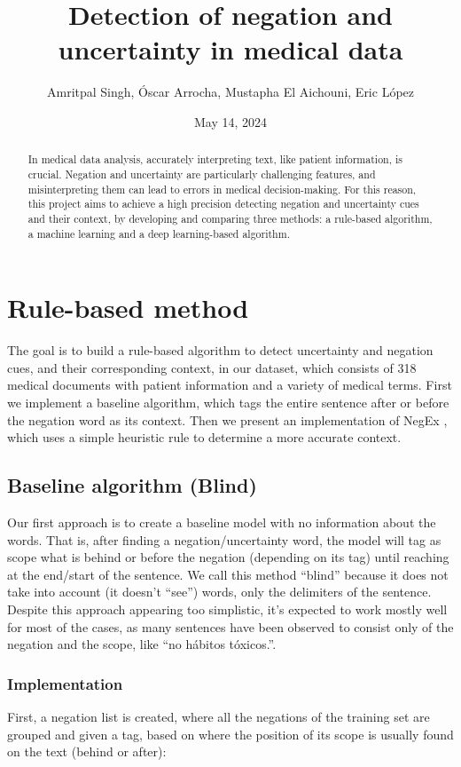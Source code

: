 \documentclass{article}
\begin{document}
\title{Detection of negation and uncertainty in medical data}
\author{Amritpal Singh, Óscar Arrocha, Mustapha El Aichouni, Eric López}
\date{May 14, 2024}
\maketitle

\begin{abstract}
	In medical data analysis, accurately interpreting text, like patient information, is crucial.
	Negation and uncertainty are particularly challenging features, and misinterpreting them can
	lead to errors in medical decision-making. For this reason, this project aims to achieve a high
	precision detecting negation and uncertainty cues and their context, by developing and comparing
	three methods: a rule-based algorithm, a machine learning and a deep learning-based algorithm.
\end{abstract}

\section*{Rule-based method}
The goal is to build a rule-based algorithm to detect uncertainty and negation cues, and their
corresponding context, in our dataset, which consists of 318 medical documents with patient information
and a variety of medical terms. First we implement a baseline algorithm, which tags the entire sentence
after or before the negation word as its context. Then we present an implementation of NegEx \cite{negex},
which uses a simple heuristic rule to determine a more accurate context.

\subsection*{Baseline algorithm (Blind)}
Our first approach is to create a baseline model with no information about the words. That is, after
finding a negation/uncertainty word, the model will tag as scope what is behind or before the negation
(depending on its tag) until reaching at the end/start of the sentence. We call this method “blind”
because it does not take into account (it doesn’t “see”) words, only the delimiters of the sentence.
Despite this approach appearing too simplistic, it’s expected to work mostly well for most of the cases,
as many sentences have been observed to consist only of the negation and the scope, like “no hábitos tóxicos.”.

\subsubsection*{Implementation}
First, a negation list is created, where all the negations of the training set are grouped and given a tag,
based on where the position of its scope is usually found on the text (behind or after):
\end{document}
